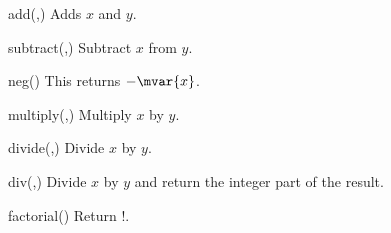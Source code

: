 \begin{math-function}{add(,)}
\mathcommand
    Adds $x$ and $y$.
\begin{codeexample}[]
 \pgfmathresult
\end{codeexample}
\end{math-function}

\begin{math-function}{subtract(,)}
\mathcommand
    Subtract $x$ from $y$.
\begin{codeexample}[]
 \pgfmathresult
\end{codeexample}
\end{math-function}

\begin{math-function}{neg()}
\mathcommand
    This returns $-\mvar{x}$.
\begin{codeexample}[]
 \pgfmathresult
\end{codeexample}
\end{math-function}

\begin{math-function}{multiply(,)}
\mathcommand
    Multiply $x$ by $y$.
\begin{codeexample}[]
 \pgfmathresult
\end{codeexample}
\end{math-function}

\begin{math-function}{divide(,)}
\mathcommand
    Divide $x$ by $y$.
\begin{codeexample}[]
 \pgfmathresult
\end{codeexample}
\end{math-function}

\begin{math-function}{div(,)}
\mathcommand
    Divide $x$ by $y$ and return the integer part of the result.
\begin{codeexample}[]
 \pgfmathresult
\end{codeexample}
\end{math-function}

\begin{math-function}{factorial()}
\mathcommand
    Return !.
\begin{codeexample}[]
 \pgfmathresult
\end{codeexample}
\end{math-function}

